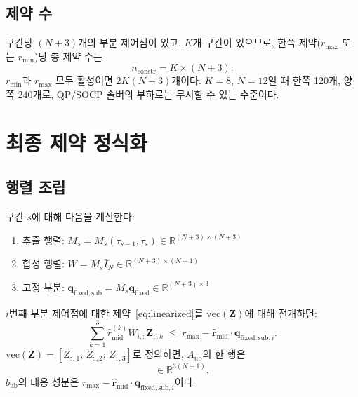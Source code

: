 \documentclass[11pt]{article}
\begin{document}
\subsection{제약 수}

구간당 $(N{+}3)$개의 부분 제어점이 있고, $K$개 구간이 있으므로,
한쪽 제약($r_{\max}$ 또는 $r_{\min}$)당 총 제약 수는
\begin{equation}
  n_{\mathrm{constr}} = K \times (N{+}3).
\end{equation}
$r_{\min}$과 $r_{\max}$ 모두 활성이면 $2K(N{+}3)$개이다.
$K{=}8$, $N{=}12$일 때 한쪽 120개, 양쪽 240개로,
QP/SOCP 솔버의 부하로는 무시할 수 있는 수준이다.

\section{최종 제약 정식화}

\subsection{행렬 조립}

구간 $s$에 대해 다음을 계산한다:
\begin{enumerate}
  \item 추출 행렬: $M_s = M_s(\tau_{s-1}, \tau_s) \in \mathbb{R}^{(N+3)\times(N+3)}$
  \item 합성 행렬: $W = M_s \bar{I}_N \in \mathbb{R}^{(N+3)\times(N+1)}$
  \item 고정 부분: $\mathbf{q}_{\mathrm{fixed,sub}} = M_s \mathbf{q}_{\mathrm{fixed}} \in \mathbb{R}^{(N+3)\times 3}$
\end{enumerate}
$i$번째 부분 제어점에 대한 제약~\eqref{eq:linearized}를
$\mathrm{vec}(\mathbf{Z})$에 대해 전개하면:
\begin{equation}
  \sum_{k=1}^{3} \hat{r}_{\mathrm{mid}}^{(k)} W_{i,:} \mathbf{Z}_{:,k}
  \;\le\; r_{\max} - \hat{\mathbf{r}}_{\mathrm{mid}} \cdot \mathbf{q}_{\mathrm{fixed,sub},i}.
\end{equation}
$\mathrm{vec}(\mathbf{Z}) = [Z_{:,1};\, Z_{:,2};\, Z_{:,3}]$로 정의하면,
$A_{\mathrm{ub}}$의 한 행은
\begin{equation}
  [\hat{r}_1 W_{i,:},\; \hat{r}_2 W_{i,:},\; \hat{r}_3 W_{i,:}]
  \in \mathbb{R}^{3(N+1)},
\end{equation}
$b_{\mathrm{ub}}$의 대응 성분은
$r_{\max} - \hat{\mathbf{r}}_{\mathrm{mid}} \cdot \mathbf{q}_{\mathrm{fixed,sub},i}$이다.
\end{document}
